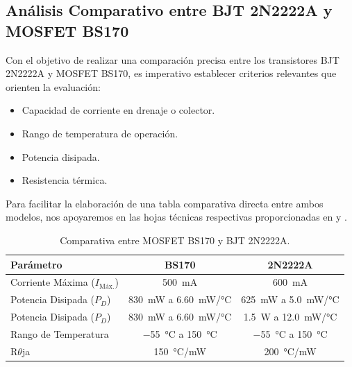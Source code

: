 \newpage

\subsection{Análisis Comparativo entre BJT 2N2222A y MOSFET BS170}

Con el objetivo de realizar una comparación precisa entre los transistores BJT 2N2222A y MOSFET BS170, es imperativo establecer criterios relevantes que orienten la evaluación:

\begin{itemize}
\item Capacidad de corriente en drenaje o colector.
\item Rango de temperatura de operación.
\item Potencia disipada.
\item Resistencia térmica.
\end{itemize}

Para facilitar la elaboración de una tabla comparativa directa entre ambos modelos, nos apoyaremos en las hojas técnicas respectivas proporcionadas en \cite{BS170Datasheet} y \cite{2N2222A_Datasheet}.

\begin{table}[h]
    \centering
    \begin{tabularx}{\textwidth}{lcc}
        \hline
        \textbf{Parámetro} & \textbf{BS170} & \textbf{2N2222A} \\ 
        \hline
        Corriente Máxima ($I_{\text{Máx.}}$) & \SI{500}{\milli\ampere} & \SI{600}{\milli\ampere} \\ 
        Potencia Disipada ($P_D$) & \SI{830}{\milli\watt} a \SI{6.60}{\milli\watt/\celsius} & \SI{625}{\milli\watt} a \SI{5.0}{\milli\watt/\celsius} \\ 
        Potencia Disipada ($P_D$) & \SI{830}{\milli\watt} a \SI{6.60}{\milli\watt/\celsius}  & \SI{1.5}{\watt} a \SI{12.0}{\milli\watt/\celsius} \\ 
        Rango de Temperatura & \SI{-55}{\celsius} a \SI{+150}{\celsius} & \SI{-55}{\celsius} a \SI{+150}{\celsius} \\ 
        R$\theta$ja & \SI{150}{\celsius/\milli\watt} & \SI{200}{\celsius/\milli\watt} \\ 
        \hline
    \end{tabularx}
    \caption{Comparativa entre MOSFET BS170 y BJT 2N2222A.}
    \label{tab:comparisonmodeltransistor}
\end{table}

